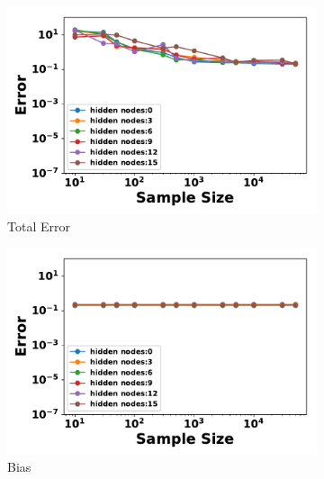\documentclass[letterpaper]{article} %
\begin{document}
        \begin{figure}[t]
          \centering
          \begin{subfigure}[b]{0.33\textwidth}
              \centering
              \includegraphics[width=\textwidth]{./RBM_Total_Error_Selected-eps-converted-to.pdf}
              \caption{Total Error}
          \end{subfigure}
          \begin{subfigure}[b]{0.33\textwidth}
              \centering
              \includegraphics[width=\textwidth]{./RBM_Bias_Selected-eps-converted-to.pdf}
              \caption{Bias}
          \end{subfigure}
          \begin{subfigure}[b]{0.33\textwidth}
              \centering

\end{subfigure}
\end{figure}
\end{document}
